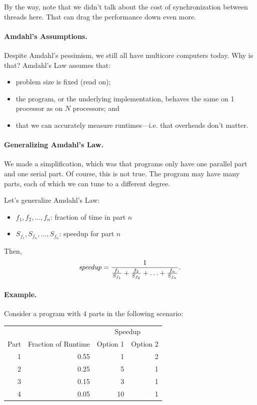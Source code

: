 \documentclass[a4paper]{report}
\begin{document}
By the way, note that we didn't talk about the cost of synchronization
between threads here. That can drag the performance down even more.

\paragraph{Amdahl's Assumptions.}
Despite Amdahl's pessimism, we still all have multicore computers today.
Why is that? Amdahl's Law assumes that:
\begin{itemize}[noitemsep]
    \item problem size is fixed (read on);
    \item the program, or the underlying implementation, behaves the same on 1 processor as on $N$ processors; and
    \item that we can accurately measure runtimes---i.e. that overheads don't matter.
\end{itemize}

\paragraph{Generalizing Amdahl's Law.} We made a simplification,
which was that programs only have one parallel part and one serial part.
Of course, this is not true. The program may have many parts,
 each of which we can tune to a different degree.

Let's generalize Amdahl's Law:

\begin{itemize}
\item  $f_1, f_2, \ldots, f_n$: fraction of time in part $n$
\item  $S_{f_1}, S_{f_n}, \ldots, S_{f_n}$: speedup for part $n$
\end{itemize}

Then,
\[\mbox{\em speedup} = \frac{1}{\frac{f_1}{S_{f_1}} + \frac{f_2}{S_{f_2}} + \ldots +
     \frac{f_n}{S_{f_n}}}.\]

\paragraph{Example.} Consider a program with 4 parts in the following scenario:

\begin{center}
     \begin{tabular}{r|r|r|r}
     \multicolumn{2}{l}{} & \multicolumn{2}{|c}{Speedup} \\
     Part & Fraction of Runtime & Option 1 & Option 2\\
     \hline
     1 & 0.55 & 1  & 2\\
     2 & 0.25 & 5  & 1\\
     3 & 0.15 & 3  & 1\\
     4 & 0.05  & 10 & 1\\
     \end{tabular}
 \end{center}
\end{document}
